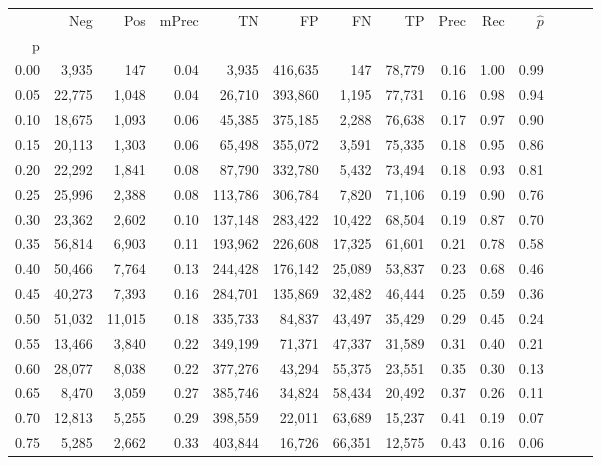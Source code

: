 \begin{tabular}{rrrrrrrrrrrrrr}
\toprule
{} &     Neg &     Pos & mPrec &       TN &       FP &      FN &      TP &  Prec &   Rec & $\hat{p}$ \\
p    &         &         &       &          &          &         &         &       &       &           \\
\midrule
0.00 &   3,935 &     147 &  0.04 &    3,935 &  416,635 &     147 &  78,779 &  0.16 &  1.00 &      0.99 \\
0.05 &  22,775 &   1,048 &  0.04 &   26,710 &  393,860 &   1,195 &  77,731 &  0.16 &  0.98 &      0.94 \\
0.10 &  18,675 &   1,093 &  0.06 &   45,385 &  375,185 &   2,288 &  76,638 &  0.17 &  0.97 &      0.90 \\
0.15 &  20,113 &   1,303 &  0.06 &   65,498 &  355,072 &   3,591 &  75,335 &  0.18 &  0.95 &      0.86 \\
0.20 &  22,292 &   1,841 &  0.08 &   87,790 &  332,780 &   5,432 &  73,494 &  0.18 &  0.93 &      0.81 \\
0.25 &  25,996 &   2,388 &  0.08 &  113,786 &  306,784 &   7,820 &  71,106 &  0.19 &  0.90 &      0.76 \\
0.30 &  23,362 &   2,602 &  0.10 &  137,148 &  283,422 &  10,422 &  68,504 &  0.19 &  0.87 &      0.70 \\
0.35 &  56,814 &   6,903 &  0.11 &  193,962 &  226,608 &  17,325 &  61,601 &  0.21 &  0.78 &      0.58 \\
0.40 &  50,466 &   7,764 &  0.13 &  244,428 &  176,142 &  25,089 &  53,837 &  0.23 &  0.68 &      0.46 \\
0.45 &  40,273 &   7,393 &  0.16 &  284,701 &  135,869 &  32,482 &  46,444 &  0.25 &  0.59 &      0.36 \\
0.50 &  51,032 &  11,015 &  0.18 &  335,733 &   84,837 &  43,497 &  35,429 &  0.29 &  0.45 &      0.24 \\
0.55 &  13,466 &   3,840 &  0.22 &  349,199 &   71,371 &  47,337 &  31,589 &  0.31 &  0.40 &      0.21 \\
0.60 &  28,077 &   8,038 &  0.22 &  377,276 &   43,294 &  55,375 &  23,551 &  0.35 &  0.30 &      0.13 \\
0.65 &   8,470 &   3,059 &  0.27 &  385,746 &   34,824 &  58,434 &  20,492 &  0.37 &  0.26 &      0.11 \\
0.70 &  12,813 &   5,255 &  0.29 &  398,559 &   22,011 &  63,689 &  15,237 &  0.41 &  0.19 &      0.07 \\
0.75 &   5,285 &   2,662 &  0.33 &  403,844 &   16,726 &  66,351 &  12,575 &  0.43 &  0.16 &      0.06 \\

\end{tabular}
